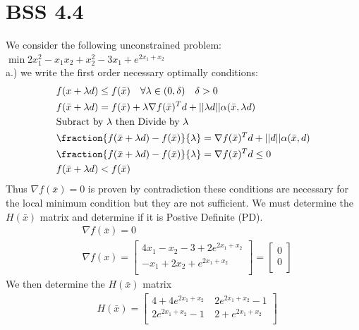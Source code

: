 \documentclass[12pt]{article}
\begin{document}
\section{BSS 4.4}
We consider the following unconstrained problem: \\ 
$\min 2x_1^2 -x_1x_2 + x_2^2 - 3x_1 + e^{2x_1 + x_2}$\\
a.) we write the first order necessary optimally conditions:\\
    \begin{align*}
        &f(x + \lambda d) \leq f(\bar x) \quad \forall \lambda \in (0, \delta) \quad \delta > 0\\
        &f(\bar x + \lambda d) = f(\bar x) + \lambda \nabla f(\bar x)^T d + || \lambda d|| \alpha(\bar x, \lambda d)\\
        &\text{Subract by $\lambda$ then Divide by } \lambda \\
        &\fraction{f(\bar x + \lambda d) - f(\bar x)}{\lambda} = \nabla f(\bar x) ^T d + ||d|| \alpha(\bar x, d)\\
        &\fraction{f(\bar x + \lambda d) - f(\bar x)}{\lambda} = \nabla f(\bar x)^T d \leq 0\\
        &f(\bar x + \lambda d) < f(\bar x)
    \end{align*}
    Thus $\nabla f(\bar x) = 0$ is proven by contradiction these conditions are necessary for the local minimum condition but they are not sufficient. We must determine the $H(\bar x)$ matrix and determine if it is Postive Definite (PD).\\ 
    \begin{align*}
        &\nabla f(\bar x) = 0 \\
        &\nabla f(x) = 
        \begin{bmatrix}
            4x_1 -x_2 -3 + 2 e^{2x_1 + x_2}\\
            -x_1 + 2x_2 + e^{2x_1 + x_2}\\
        \end{bmatrix} 
        = 
        \begin{bmatrix}
            0\\
            0\\
        \end{bmatrix} 
    \end{align*}
    We then determine the $H(\bar x)$ matrix\\
    \begin{align*}
        &H(\bar x) = 
            \begin{bmatrix}
                4 + 4e^{2x_1 + x_2} & 2e^{2x_1 + x_2} - 1\\
                2e^{2x_1 + x_2} - 1\ & 2 + e^{2x_1 + x_2} \\
            \end{bmatrix} 
    \end{align*}
\end{document}
